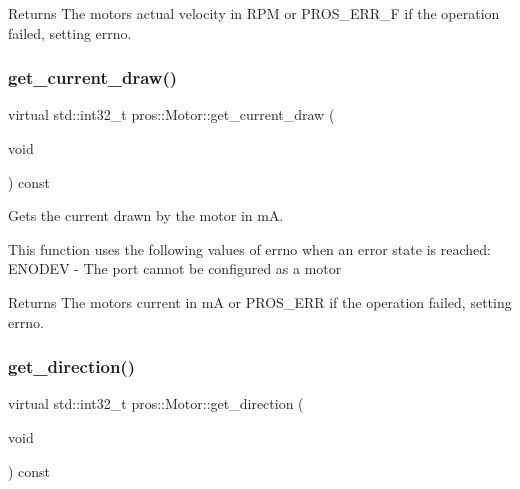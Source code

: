 \begin{DoxyReturn}{Returns}
The motor\textquotesingle{}s actual velocity in R\+PM or P\+R\+O\+S\+\_\+\+E\+R\+R\+\_\+F if the operation failed, setting errno. 
\end{DoxyReturn}
\mbox{\label{classpros_1_1Motor_a502eaf3859452721e2327e53ab3f34d8}} 
\subsubsection{\texorpdfstring{get\+\_\+current\+\_\+draw()}{get\_current\_draw()}}
{\footnotesize\ttfamily virtual std\+::int32\+\_\+t pros\+::\+Motor\+::get\+\_\+current\+\_\+draw (\begin{DoxyParamCaption}\item[{void}]{ }\end{DoxyParamCaption}) const\hspace{0.3cm}{\ttfamily [virtual]}}



Gets the current drawn by the motor in mA. 

This function uses the following values of errno when an error state is reached\+: E\+N\+O\+D\+EV -\/ The port cannot be configured as a motor

\begin{DoxyReturn}{Returns}
The motor\textquotesingle{}s current in mA or P\+R\+O\+S\+\_\+\+E\+RR if the operation failed, setting errno. 
\end{DoxyReturn}
\mbox{\label{classpros_1_1Motor_acea42a96da651f72f138ea268c76217f}} 
\subsubsection{\texorpdfstring{get\+\_\+direction()}{get\_direction()}}
{\footnotesize\ttfamily virtual std\+::int32\+\_\+t pros\+::\+Motor\+::get\+\_\+direction (\begin{DoxyParamCaption}\item[{void}]{ }\end{DoxyParamCaption}) const\hspace{0.3cm}{\ttfamily [virtual]}}



